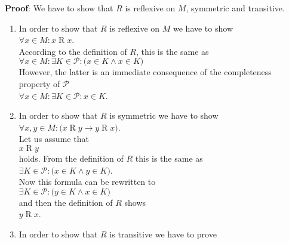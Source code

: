 \noindent
\textbf{Proof}: We have to show that $R$ is reflexive on $M$, symmetric and
transitive.
\begin{enumerate}
\item In order to show that $R$ is reflexive on $M$ we have to show
      \\[0.2cm]
      \hspace*{1.3cm}
      $\forall x \in M: x \mathop{R} x$.
      \\[0.2cm]
      According to the definition of $R$, this is the same as 
      \\[0.2cm]
      \hspace*{1.3cm}
      $\forall x \in M: \exists K \in \mathcal{P}: \bigl(x \in K \wedge x \in K\bigr)$
      \\[0.2cm]
      However, the latter is an immediate consequence of the completeness property of $\mathcal{P}$
      \\[0.2cm]
      \hspace*{1.3cm}
      $\forall x \in M: \exists K \in \mathcal{P}: x \in K$.
\item In order to show that $R$ is symmetric we have to show
      \\[0.2cm]
      \hspace*{1.3cm}
      $\forall x, y \in M:\bigl( x \mathop{R} y \rightarrow y \mathop{R} x\bigr)$.
      \\[0.2cm]
      Let us assume that 
      \\[0.2cm]
      \hspace*{1.3cm}
      $x \mathop{R} y$ 
      \\[0.2cm]
      holds.  From the definition of $R$ this is the same as
      \\[0.2cm]
      \hspace*{1.3cm}
      $\exists K \in \mathcal{P}: \bigl(x \in K \wedge y \in K\bigr)$.
      \\[0.2cm]
      Now this formula can be rewritten to
      \\[0.2cm]
      \hspace*{1.3cm}
      $\exists K \in \mathcal{P}: \bigl(y \in K \wedge x \in K\bigr)$
      \\[0.2cm]
      and then the definition of $R$ shows
      \\[0.2cm]
      \hspace*{1.3cm}
      $y \mathop{R} x$.
\item In order to show that $R$ is transitive we have to prove 
      \\[0.2cm]

\end{enumerate}
